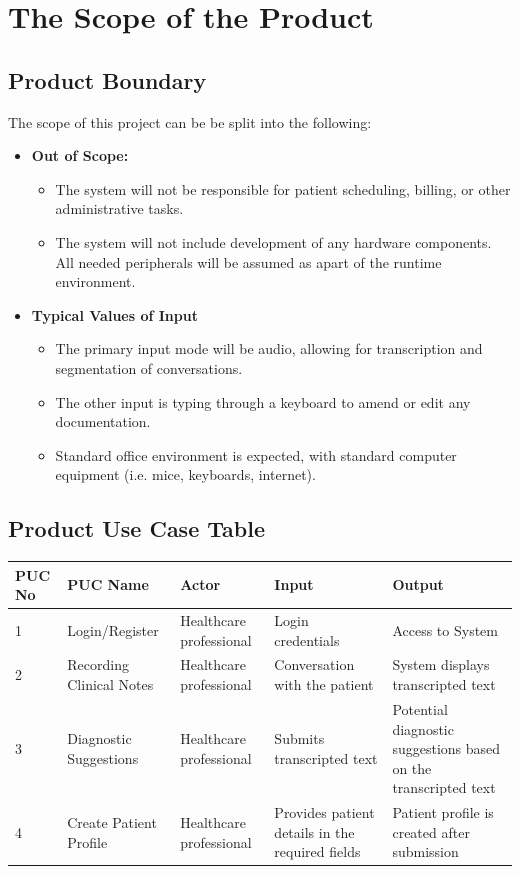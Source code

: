 \documentclass[12pt]{article}
\begin{document}
\section{The Scope of the Product}
\subsection{Product Boundary}
The scope of this project can be be split into the following:

\begin{itemize}
  \item \textbf{Out of Scope:}
  \begin{itemize}
    \item The system will not be responsible for patient scheduling, billing, or other administrative tasks.
    \item The system will not include development of any hardware components. All needed peripherals will be assumed as apart of the runtime environment.
  \end{itemize}
  \item \textbf{Typical Values of Input}
  \begin{itemize}
    \item The primary input mode will be audio, allowing for transcription and segmentation of conversations.
    \item The other input is typing through a keyboard to amend or edit any documentation.
    \item Standard office environment is expected, with standard computer equipment (i.e. mice, keyboards, internet).
  \end{itemize}
\end{itemize}

\subsection{Product Use Case Table}

\begin{tabular}{ | p{3cm} | p{3cm} | p{3cm} | p{3cm} | p{3cm} | }
  \hline
  \textbf{PUC No} & \textbf{PUC Name} & \textbf{Actor} & \textbf{Input} & \textbf{Output}  \\ \hline
  1 & Login/Register & Healthcare professional & Login credentials & Access to System \\ \hline
  2 & Recording Clinical Notes & Healthcare professional & Conversation with the patient & System displays transcripted text \\ \hline
  3 & Diagnostic Suggestions & Healthcare professional & Submits transcripted text & Potential diagnostic suggestions based on the transcripted text \\ \hline
  4 & Create Patient Profile & Healthcare professional & Provides patient details in the required fields & Patient profile is created after submission \\ \hline 
\end{tabular}
\end{document}
